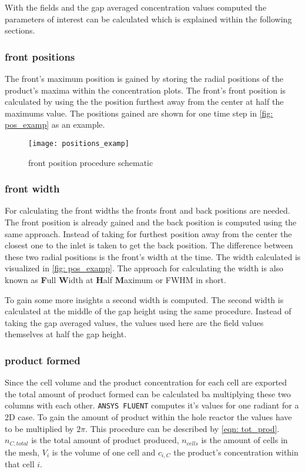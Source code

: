 \documentclass[../thesis.tex]{subfiles}
\begin{document}
With the fields and the gap averaged concentration values computed the parameters of interest can be calculated which is explained within the following sections.

\subsubsection{front positions}

The front's maximum position is gained by storing the radial positions of the product's maxima within the concentration plots. The front's front position is calculated by using the the position furthest away from the center at half the maximums value. The positions gained are shown for one time step in \autoref{fig: pos_examp} as an example.

\begin{figure}[htb]
	\centering
	\texttt{[image: positions\_examp]}
	\caption{front position procedure schematic}
	\label{fig: pos_examp}
\end{figure}

\subsubsection{front width}

For calculating the front widths the fronts front and back positions are needed. The front position is already gained and the back position is computed using the same approach. Instead of taking for furthest position away from the center the closest one to the inlet is taken to get the back position. The difference between these two radial positions is the front's width at the time. The width calculated is visualized in \autoref{fig: pos_examp}. The approach for calculating the width is also known as \textbf{F}ull \textbf{W}idth at \textbf{H}alf \textbf{M}aximum or FWHM in short.

To gain some more insights a second width is computed. The second width is calculated at the middle of the gap height using the same procedure. Instead of taking the gap averaged values, the values used here are the field values themselves at half the gap height.

\subsubsection{product formed}

Since the cell volume and the product concentration for each cell are exported the total amount of product formed can be calculated ba multiplying these two columns with each other. \texttt{ANSYS FLUENT} computes it's values for one radiant for a 2D case. To gain the amount of product within the hole reactor the values have to be multiplied by $2 \pi$. This procedure can be described by \autoref{eqn: tot_prod}. $ n_{C, total} $ is the total amount of product produced, $n_{cells}$ is the amount of cells in the mesh, $ V_i $ is the volume of one cell and $c_{i, C}$ the product's concentration within that cell $i$.
\end{document}
